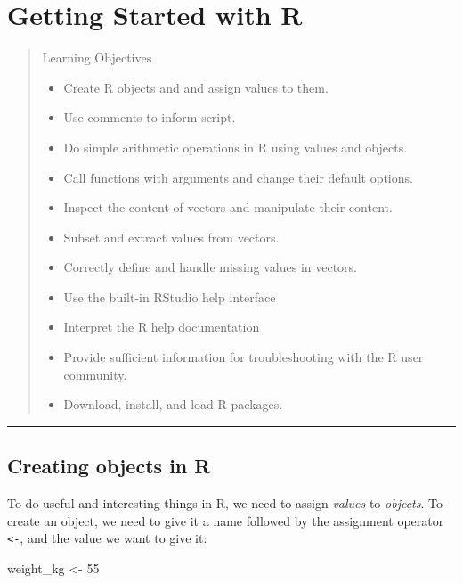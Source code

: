\documentclass[]{book}
\newenvironment{Shaded}{\begin{snugshade}}{\end{snugshade}}
\newcommand{\DecValTok}[1]{\textcolor[rgb]{0.00,0.00,0.81}{#1}}
\newcommand{\StringTok}[1]{\textcolor[rgb]{0.31,0.60,0.02}{#1}}
\newcommand{\NormalTok}[1]{#1}
\providecommand{\tightlist}{%
  \setlength{\itemsep}{0pt}\setlength{\parskip}{0pt}}
\theoremstyle{definition}
\theoremstyle{definition}
\theoremstyle{remark}
\begin{document}
\chapter{Getting Started with R}\label{gettingstarted}

\begin{quote}
Learning Objectives

\begin{itemize}
\tightlist
\item
  Create R objects and and assign values to them.
\item
  Use comments to inform script.
\item
  Do simple arithmetic operations in R using values and objects.
\item
  Call functions with arguments and change their default options.
\item
  Inspect the content of vectors and manipulate their content.
\item
  Subset and extract values from vectors.
\item
  Correctly define and handle missing values in vectors.
\item
  Use the built-in RStudio help interface
\item
  Interpret the R help documentation
\item
  Provide sufficient information for troubleshooting with the R user
  community.
\item
  Download, install, and load R packages.
\end{itemize}
\end{quote}

\begin{center}\rule{0.5\linewidth}{\linethickness}\end{center}

\section{Creating objects in R}\label{creating-objects-in-r}

To do useful and interesting things in R, we need to assign
\emph{values} to \emph{objects}. To create an object, we need to give it
a name followed by the assignment operator \texttt{\textless{}-}, and
the value we want to give it:

\begin{Shaded}
\begin{Highlighting}[]
\NormalTok{weight_kg <-}\StringTok{ }\DecValTok{55}
\end{Highlighting}
\end{Shaded}
\end{document}
